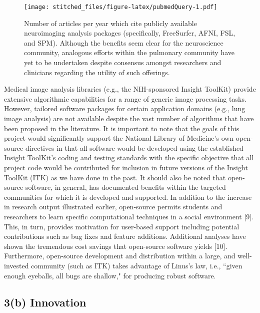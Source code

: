 \documentclass[11pt,]{article}
\begin{document}
\begin{figure}[htbp]
\centering
\texttt{[image: stitched\_files/figure-latex/pubmedQuery-1.pdf]}
\caption{Number of articles per year which cite publicly available
neuroimaging analysis packages (specifically, FreeSurfer, AFNI, FSL, and
SPM). Although the benefits seem clear for the neuroscience community,
analogous efforts within the pulmonary community have yet to be
undertaken despite consensus amongst researchers and clinicians
regarding the utility of such offerings.}
\end{figure}

Medical image analysis libraries (e.g., the NIH-sponsored Insight
ToolKit) provide extensive algorithmic capabilities for a range of
generic image processing tasks. However, tailored software packages for
certain application domains (e.g., lung image analysis) are not
available despite the vast number of algorithms that have been proposed
in the literature. It is important to note that the goals of this
project would significantly support the National Library of Medicine's
own open-source directives in that all software would be developed using
the established Insight ToolKit's coding and testing standards with the
specific objective that all project code would be contributed for
inclusion in future versions of the Insight ToolKit (ITK) as we have
done in the past. It should also be noted that open-source software, in
general, has documented benefits within the targeted communities for
which it is developed and supported. In addition to the increase in
research output illustrated earlier, open-source permits students and
researchers to learn specific computational techniques in a social
environment {[}9{]}. This, in turn, provides motivation for user-based
support including potential contributions such as bug fixes and feature
additions. Additional analyses have shown the tremendous cost savings
that open-source software yields {[}10{]}. Furthermore, open-source
development and distribution within a large, and well-invested community
(such as ITK) takes advantage of Linus's law, i.e., ``given enough
eyeballs, all bugs are shallow," for producing robust software.

\subsection{\texorpdfstring{\textbf{3(b)
Innovation}}{3(b) Innovation}}\label{b-innovation}
\end{document}
